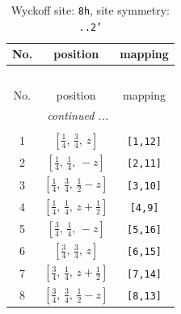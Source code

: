 \documentclass[fleqn,8pt]{jsarticle}
\begin{document}
\begin{longtable}{ccc}
\caption{Wyckoff site: {\tt 8h}, site symmetry: {\tt ..2'}}
 \\
 \hline \hline
No. & position & mapping \\ \hline \endfirsthead

\multicolumn{2}{l}{\tablename\ \thetable{}} \\
 \hline \hline
No. & position & mapping \\ \hline \endhead

 \hline \hline
\multicolumn{2}{r}{\footnotesize\it continued ...} \\ \endfoot

 \hline \hline
\multicolumn{2}{r}{} \\ \endlastfoot

1 & $\left[ \frac{1}{4},\, \frac{3}{4},\, z \right]$ & {\tt [1,12]} \\ \hline
2 & $\left[ \frac{1}{4},\, \frac{1}{4},\, - z \right]$ & {\tt [2,11]} \\ \hline
3 & $\left[ \frac{1}{4},\, \frac{3}{4},\, \frac{1}{2} - z \right]$ & {\tt [3,10]} \\ \hline
4 & $\left[ \frac{1}{4},\, \frac{1}{4},\, z + \frac{1}{2} \right]$ & {\tt [4,9]} \\ \hline
5 & $\left[ \frac{3}{4},\, \frac{1}{4},\, - z \right]$ & {\tt [5,16]} \\ \hline
6 & $\left[ \frac{3}{4},\, \frac{3}{4},\, z \right]$ & {\tt [6,15]} \\ \hline
7 & $\left[ \frac{3}{4},\, \frac{1}{4},\, z + \frac{1}{2} \right]$ & {\tt [7,14]} \\ \hline
8 & $\left[ \frac{3}{4},\, \frac{3}{4},\, \frac{1}{2} - z \right]$ & {\tt [8,13]} \\
\end{longtable}
\renewcommand{\arraystretch}{1.2}
\end{document}
